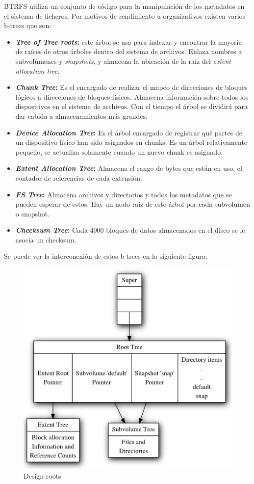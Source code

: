 BTRFS utiliza un conjunto de código para la manipulación de los metadatos en el sistema de ficheros. Por motivos de rendimiento u organizativos existen varios b-trees \cite{btrees} que son:
\begin{itemize}
    \item \textbf{\textit{Tree of Tree roots}:} este árbol se usa para indexar  y encontrar la mayoría de raíces de otros árboles dentro del sistema de archivos. Enlaza nombres a subvolúmenes y \textit{snapshots}, y almacena la ubicación de la raíz del \textit{extent allocation tree}. 
    \item \textbf{\textit{Chunk Tree}:} Es el encargado de realizar el mapeo de direcciones de bloques lógicos a direcciones de bloques físicos. Almacena información sobre todos los dispositivos en el sistema de archivos. Con el tiempo el árbol se dividirá para dar cabida a almacenamientos más grandes.
    \item \textbf{\textit{Device Allocation Tree}:} Es el árbol encargado de registrar qué partes de un dispositivo físico han sido asignados en chunks. Es un árbol relativamente pequeño, se actualiza solamente cuando un nuevo chunk es asignado. 
    \item \textbf{\textit{Extent Allocation Tree}:} Almacena el rango de bytes que están en uso, el contador de referencias de cada extensión.
    \item \textbf{\textit{FS Tree}:} Almacena archivos y directorios y todos los metadatos que se pueden esperar de estos. Hay un nodo raíz de este árbol por cada subvolumen o snapshot.
    \item \textbf{\textit{Checksum Tree}:} Cada 4000 bloques de datos almacenados en el disco se le asocia un checksum.
\end{itemize}
\newpage
Se puede ver la interconexión de estos b-trees en la siguiente figura: 

\begin{figure}[H]
    \centering
    \includegraphics[scale=0.6]{doc/assets/images/btrfs/Design-roots.png}
    \caption{Design roots}
    \label{fig:my_label}
\end{figure}


